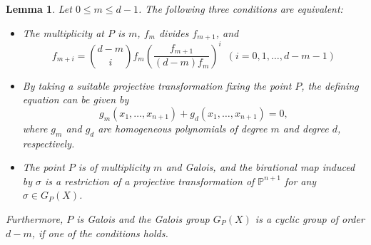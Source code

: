 \documentclass[10pt,oneside]{amsart}
\newtheorem{lemma}{Lemma}
\theoremstyle{definition}
\begin{document}
\begin{lemma} \label{l1} 
Let $0 \le m \le d-1$. 
The following three conditions are equivalent{\rm :}
\begin{itemize}
\item[(1)$_m$] The multiplicity at $P$ is $m$, $f_m$ divides $f_{m+1}$, 
and $$f_{m+i}=\binom{d-m}{i} f_m \left(\frac{f_{m+1}}{(d-m)f_m}\right)^i  \,\,\, (i=0,1,\dots, d-m-1)$$
\item[(2)$_m$] By taking a suitable projective transformation fixing the point $P$, the defining equation can be given by 
$$g_m(x_1, \dots, x_{n+1}) + g_d(x_1, \dots, x_{n+1})=0,$$
where $g_m$ and $g_d$ are homogeneous polynomials of degree $m$ and degree $d$, respectively. 
\item[(3)$_m$] The point $P$ is of multiplicity $m$ and Galois, and the birational map induced by $\sigma$ is a restriction of a projective transformation of $\mathbb{P}^{n+1}$ for any $\sigma \in G_P(X)$. 
\end{itemize}
Furthermore, $P$ is Galois and the Galois group $G_P(X)$ is a cyclic group of order $d-m$, if one of the conditions holds. 
\end{lemma} 
\end{document}
